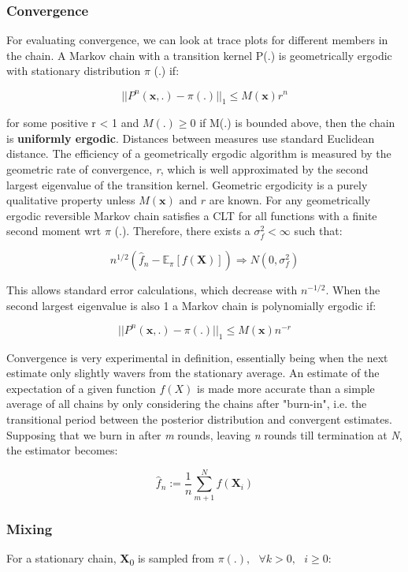 \documentclass[a4paper]{article}
\begin{document}
\subsubsection{Convergence}
\label{sec:orgc06c667}

For evaluating convergence, we can look at trace plots for different members in the chain. A Markov chain with a transition kernel P(.) is geometrically ergodic with stationary distribution \(\pi\) (.) if:

\[||P^n (\mathbf{x}, .) - \pi (.)||_1 \leq M(\mathbf{x}) r^n \]

for some positive r < 1 and \(M(.) \geq 0\) if M(.) is bounded above, then the chain is \textbf{uniformly ergodic}. Distances between measures use standard Euclidean distance. The efficiency of a geometrically ergodic algorithm is measured by the geometric rate of convergence, \emph{r}, which is well approximated by the second largest eigenvalue of the transition kernel. Geometric ergodicity is a purely qualitative property unless \(M(\mathbf{x}) \text{ and } r\) are known. For any geometrically ergodic reversible Markov chain satisfies a CLT for all functions with a finite second moment wrt \(\pi\) (.). Therefore, there exists a \(\sigma^2_f < \infty\) such that:

\[n^{1/2} \left(\hat{f}_n - \mathbb{E}_\pi \left[f (\mathbf{X}) \right] \right) \Rightarrow N(0, \sigma^2_f) \]

This allows standard error calculations, which decrease with \(n^{-1/2}\). When the second largest eigenvalue is also 1 a Markov chain is polynomially ergodic if:

\[||P^n (\mathbf{x}, .) - \pi(.)||_1 \leq M(\mathbf{x}) n^{-r} \]

Convergence is very experimental in definition, essentially being when the next estimate only slightly wavers from the stationary average. An estimate of the expectation of a given function \(f(X)\) is made more accurate than a simple average of all chains by only considering the chains after "burn-in", i.e. the transitional period between the posterior distribution and convergent estimates. Supposing that we burn in after \emph{m} rounds, leaving \emph{n} rounds till termination at \emph{N}, the estimator becomes:

\[\hat{f}_n := \frac{1}{n} \sum^{N}_{m+1} f(\mathbf{X}_i) \]
\subsubsection{Mixing}
\label{sec:org2317cc4}
For a stationary chain, \textbf{X}\textsubscript{0} is sampled from \(\pi (.), \text{ } \forall k > 0, \text{ } i \geq 0\):
\end{document}
